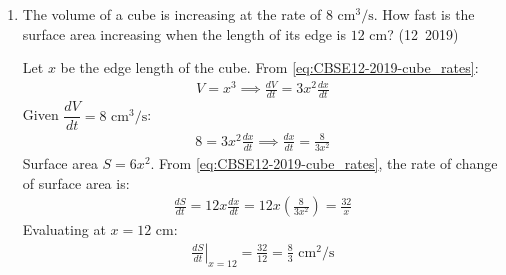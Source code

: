 \begin{enumerate}[label=\thesubsection.\arabic*, ref=\thesubsection.\theenumi]
\solution
Taking the natural logarithm on both sides:
\begin{align}
	\ln\brak{a + bx} + \frac{y}{x} = \ln x \implies \frac{y}{x} = \ln x - \ln\brak{a + bx}
\end{align}
Differentiating with respect to $x$:
\begin{align}
	\frac{x\frac{dy}{dx} - y}{x^2} = \frac{1}{x} - \frac{b}{a + bx} = \frac{a + bx - bx}{x\brak{a + bx}} = \frac{a}{x\brak{a + bx}}
\end{align}
Multiplying by $x^2$:
\begin{align}
	x\frac{dy}{dx} - y = \frac{ax}{a + bx} \label{eq:EE26BTECH11223-12-q28-rel1}
\end{align}
Differentiating \eqref{eq:EE26BTECH11223-12-q28-rel1} with respect to $x$:
\begin{align}
	\frac{dy}{dx} + x\frac{d^2y}{dx^2} - \frac{dy}{dx} &= \frac{\brak{a + bx}\brak{a} - \brak{ax}\brak{b}}{\brak{a + bx}^2} \\
	x\frac{d^2y}{dx^2} &= \frac{a^2}{\brak{a + bx}^2}
\end{align}
Multiplying both sides by $x^2$:
\begin{align}
	x^3\frac{d^2y}{dx^2} = \frac{a^2 x^2}{\brak{a + bx}^2} = \left(\frac{ax}{a + bx}\right)^2
\end{align}
Substituting \eqref{eq:EE26BTECH11223-12-q28-rel1}:
\begin{align}
	x^3\frac{d^2y}{dx^2} = \left(x\frac{dy}{dx} - y\right)^2
\end{align}
The following code verifies the differential identity:
\begin{lstlisting}[frame=single, basicstyle=\ttfamily\small]
	codes/12/q28.py
\end{lstlisting}

\item The volume of a cube is increasing at the rate of $8\text{ cm}^3/\text{s}$. How fast is the surface area increasing when the length of its edge is $12\text{ cm}$?
\hfill (12~2019)

\solution
Let $x$ be the edge length of the cube. From \eqref{eq:CBSE12-2019-cube_rates}:
\begin{align}
	V = x^3 \implies \frac{dV}{dt} = 3x^2 \frac{dx}{dt}
\end{align}
Given $\dfrac{dV}{dt} = 8\text{ cm}^3/\text{s}$:
\begin{align}
	8 = 3x^2 \frac{dx}{dt} \implies \frac{dx}{dt} = \frac{8}{3x^2}
\end{align}
Surface area $S = 6x^2$. From \eqref{eq:CBSE12-2019-cube_rates}, the rate of change of surface area is:
\begin{align}
	\frac{dS}{dt} = 12x \frac{dx}{dt} = 12x \left(\frac{8}{3x^2}\right) = \frac{32}{x}
\end{align}
Evaluating at $x = 12\text{ cm}$:
\begin{align}
	\left.\frac{dS}{dt}\right|_{x=12} = \frac{32}{12} = \frac{8}{3}\text{ cm}^2/\text{s}
\end{align}



\end{enumerate}
